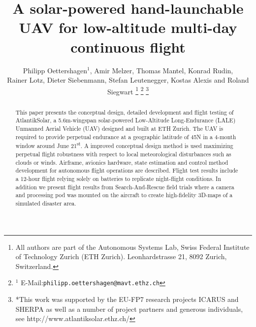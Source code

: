 \documentclass[letterpaper, 10 pt, conference]{ieeeconf}  %
\title{\LARGE \bf A solar-powered hand-launchable UAV for low-altitude multi-day continuous flight}
\author{Philipp Oettershagen$^{1}$, Amir Melzer, Thomas Mantel, Konrad Rudin, \\ Rainer Lotz, Dieter Siebenmann, Stefan Leutenegger, Kostas Alexis and Roland Siegwart%
\thanks{All authors are part of the Autonomous Systems Lab, Swiss Federal Institute of Technology Zurich (ETH Zurich). Leonhardstrasse 21, 8092 Zurich, Switzerland. }
\thanks{$^{1}$ E-Mail:{\tt philipp.oettershagen@mavt.ethz.ch}}%
\thanks{*This work was supported by the EU-FP7 research projects ICARUS and SHERPA as well as a number of project partners and generous individuals, see http://www.atlantiksolar.ethz.ch/  }%
 }
\begin{document}
\maketitle
\thispagestyle{empty}
\pagestyle{empty}

\begin{abstract}
This paper presents the conceptual design, detailed development and flight testing of AtlantikSolar, a 5.6m-wingspan solar-powered Low-Altitude Long-Endurance (LALE) Unmanned Aerial Vehicle (UAV) designed and built at ETH Zurich. The UAV is required to provide perpetual endurance at a geographic latitude of 45\degree N in a 4-month window around June 21\textsuperscript{st}. A improved conceptual design method is used maximizing perpetual flight robustness with respect to local meteorological disturbances such as clouds or winds. Airframe, avionics hardware, state estimation and control method development for autonomous flight operations are described. Flight test results include a 12-hour flight relying solely on batteries to replicate night-flight conditions. In addition we present flight results from Search-And-Rescue field trials where a camera and processing pod was mounted on the aircraft to create high-fidelity 3D-maps of a simulated disaster area. 
\end{abstract}








\end{document}
